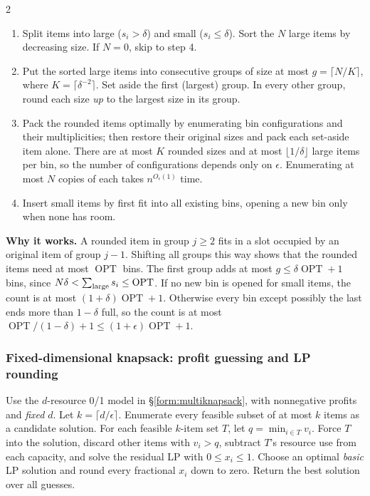 \documentclass[8pt]{extarticle}
\theoremstyle{definition}
\newcommand{\OPT}{\operatorname{OPT}}
\begin{document}
\begin{multicols*}{2}
\begin{enumerate}[leftmargin=*,nosep]
\item Split items into large ($s_i>\delta$) and small ($s_i\le\delta$).
Sort the $N$ large items by decreasing size. If $N=0$, skip to step 4.
\item Put the sorted large items into consecutive groups of size at most
$g=\lceil N/K\rceil$, where $K=\lceil\delta^{-2}\rceil$. Set aside the
first (largest) group. In every other group, round each size \emph{up} to
the largest size in its group.
\item Pack the rounded items optimally by enumerating bin configurations
and their multiplicities; then restore their original sizes and pack each
set-aside item alone. There are at most $K$ rounded sizes and at most
$\lfloor1/\delta\rfloor$ large items per bin, so the number of
configurations depends only on $\epsilon$. Enumerating at most $N$ copies
of each takes $n^{O_\epsilon(1)}$ time.
\item Insert small items by first fit into all existing bins, opening a
new bin only when none has room.
\end{enumerate}
\textbf{Why it works.} A rounded item in group $j\ge2$ fits in a slot
occupied by an original item of group $j-1$. Shifting all groups this way
shows that the rounded items need at most $\OPT$ bins. The first group
adds at most $g\le\delta\OPT+1$ bins, since $N\delta<\sum_{\rm large}s_i
\le\OPT$. If no new bin is opened for small items, the count is at most
$(1+\delta)\OPT+1$. Otherwise every bin except possibly the last ends
more than $1-\delta$ full, so the count is at most
$\OPT/(1-\delta)+1\le(1+\epsilon)\OPT+1$.

\subsubsection{Fixed-dimensional knapsack: profit guessing and LP rounding}\label{gre:multi-ptas}
Use the $d$-resource 0/1 model in \S\ref{form:multiknapsack}, with
nonnegative profits and \emph{fixed} $d$. Let $k=\lceil d/\epsilon\rceil$.
Enumerate every feasible subset of at most $k$ items as a candidate solution.
For each feasible $k$-item set $T$, let $q=\min_{i\in T}v_i$. Force $T$
into the solution, discard other items with $v_i>q$, subtract $T$'s resource
use from each capacity, and solve the residual LP with $0\le x_i\le1$.
Choose an optimal \emph{basic} LP solution and round every fractional $x_i$
down to zero. Return the best solution over all guesses.


\end{multicols*}
\end{document}
